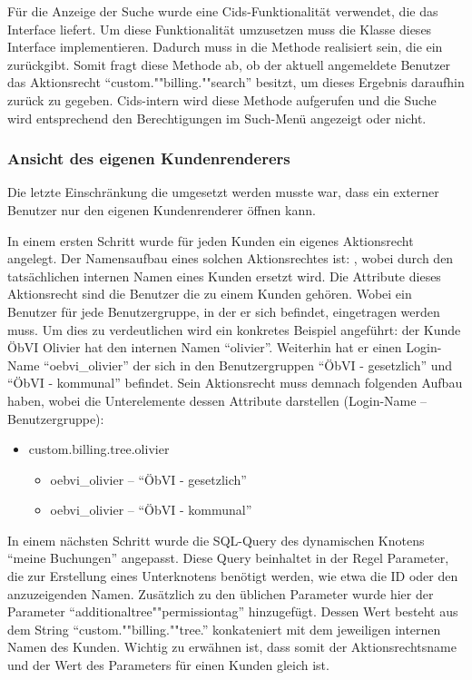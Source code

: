Für die Anzeige der Suche wurde eine Cids-Funktionalität verwendet, die das Interface  liefert.
Um diese Funktionalität umzusetzen muss die Klasse  dieses Interface implementieren.
Dadurch muss in  die Methode  realisiert sein, die ein  zurückgibt.
Somit fragt diese Methode ab, ob der aktuell angemeldete Benutzer das Aktionsrecht "`custom.""billing.""search"' besitzt, um dieses Ergebnis daraufhin zurück zu gegeben.
Cids-intern wird diese Methode aufgerufen und die Suche wird entsprechend den Berechtigungen im Such-Menü angezeigt oder nicht. 

\subsubsection{Ansicht des eigenen Kundenrenderers}
Die letzte Einschränkung die umgesetzt werden musste war, dass ein externer Benutzer nur den eigenen Kundenrenderer öffnen kann.

In einem ersten Schritt wurde für jeden Kunden ein eigenes Aktionsrecht angelegt.
Der Namensaufbau eines solchen Aktionsrechtes ist: , wobei  durch den tatsächlichen internen Namen eines Kunden ersetzt wird.
Die Attribute dieses Aktionsrecht sind die Benutzer die zu einem Kunden gehören. 
Wobei ein Benutzer für jede Benutzergruppe, in der er sich befindet, eingetragen werden muss.
Um dies zu verdeutlichen wird ein konkretes Beispiel angeführt: der Kunde \ac{ÖbVI} Olivier hat den internen Namen "`olivier"'.
Weiterhin hat er einen Login-Name "`oebvi\_olivier"' der sich in den Benutzergruppen "`ÖbVI - gesetzlich"' und "`ÖbVI - kommunal"' befindet.
Sein Aktionsrecht muss demnach folgenden Aufbau haben, wobei die Unterelemente dessen Attribute darstellen (Login-Name -- Benutzergruppe):
\begin{itemize}
\item custom.billing.tree.olivier
\begin{itemize}
\item oebvi\_olivier -- "`ÖbVI - gesetzlich"'
\item oebvi\_olivier -- "`ÖbVI - kommunal"'
\end{itemize}
\end{itemize}

In einem nächsten Schritt wurde die SQL-Query des dynamischen Knotens "`meine Buchungen"' angepasst.
Diese Query beinhaltet in der Regel Parameter, die zur Erstellung eines Unterknotens benötigt werden, wie etwa die ID oder den anzuzeigenden Namen.
Zusätzlich zu den üblichen Parameter wurde hier der Parameter "`additionaltree""permissiontag"' hinzugefügt.
Dessen Wert besteht aus dem String "`custom.""billing.""tree."' konkateniert mit dem jeweiligen internen Namen des Kunden.
Wichtig zu erwähnen ist, dass somit der Aktionsrechtsname und der Wert des Parameters für einen Kunden gleich ist. 

